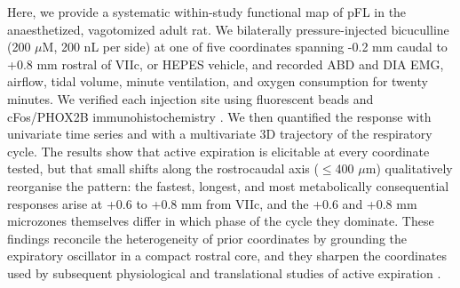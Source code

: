 Here, we provide a systematic within-study functional map of pFL in the anaesthetized, vagotomized adult rat. We bilaterally pressure-injected bicuculline (200 $\mu$M, 200 nL per side) at one of five coordinates spanning -0.2 mm caudal to +0.8 mm rostral of VIIc, or HEPES vehicle, and recorded ABD and DIA EMG, airflow, tidal volume, minute ventilation, and oxygen consumption for twenty minutes. We verified each injection site using fluorescent beads and cFos/PHOX2B immunohistochemistry \citep{Marina2010Essential,Takakura2013Phox2b}. We then quantified the response with univariate time series and with a multivariate 3D trajectory of the respiratory cycle. The results show that active expiration is elicitable at every coordinate tested, but that small shifts along the rostrocaudal axis ($\leq$400 $\mu$m) qualitatively reorganise the pattern: the fastest, longest, and most metabolically consequential responses arise at +0.6 to +0.8 mm from VIIc, and the +0.6 and +0.8 mm microzones themselves differ in which phase of the cycle they dominate. These findings reconcile the heterogeneity of prior coordinates by grounding the expiratory oscillator in a compact rostral core, and they sharpen the coordinates used by subsequent physiological and translational studies of active expiration \citep{Pagliardini2024Parafacial,Jenkin2017Roles,Pisanski2020Parafacial,Pisanski2019Parafacial}.
